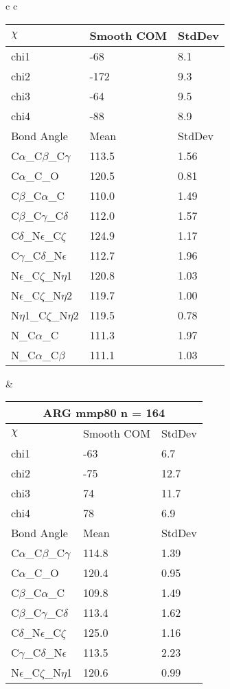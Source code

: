 \begin{longtable}{ c c }
\begin{tabular}{ l l l }
  $\chi$       & Smooth COM & StdDev \\ \midrule
  chi1 & -68 & 8.1 \\ 
  chi2 & -172 & 9.3 \\ 
  chi3 & -64 & 9.5 \\ 
  chi4 & -88 & 8.9 \\ \midrule
  Bond Angle   & Mean     & StdDev \\ \midrule
  C$\alpha$\_C$\beta$\_C$\gamma$ & 113.5 & 1.56\\
  C$\alpha$\_C\_O & 120.5 & 0.81\\
  C$\beta$\_C$\alpha$\_C & 110.0 & 1.49\\
  C$\beta$\_C$\gamma$\_C$\delta$ & 112.0 & 1.57\\
  C$\delta$\_N$\epsilon$\_C$\zeta$ & 124.9 & 1.17\\
  C$\gamma$\_C$\delta$\_N$\epsilon$ & 112.7 & 1.96\\
  N$\epsilon$\_C$\zeta$\_N$\eta$1 & 120.8 & 1.03\\
  N$\epsilon$\_C$\zeta$\_N$\eta$2 & 119.7 & 1.00\\
  N$\eta$1\_C$\zeta$\_N$\eta$2 & 119.5 & 0.78\\
  N\_C$\alpha$\_C & 111.3 & 1.97\\
  N\_C$\alpha$\_C$\beta$ & 111.1 & 1.03\\
  \bottomrule
  \end{tabular}
  &
  \begin{tabular}{ l l l }
  \toprule
  \multicolumn{3}{c}{ARG \textbf{mmp80} n = 164} \\ \toprule
  $\chi$       & Smooth COM & StdDev \\ \midrule
  chi1 & -63 & 6.7 \\ 
  chi2 & -75 & 12.7 \\ 
  chi3 & 74 & 11.7 \\ 
  chi4 & 78 & 6.9 \\ \midrule
  Bond Angle   & Mean     & StdDev \\ \midrule
  C$\alpha$\_C$\beta$\_C$\gamma$ & 114.8 & 1.39\\
  C$\alpha$\_C\_O & 120.4 & 0.95\\
  C$\beta$\_C$\alpha$\_C & 109.8 & 1.49\\
  C$\beta$\_C$\gamma$\_C$\delta$ & 113.4 & 1.62\\
  C$\delta$\_N$\epsilon$\_C$\zeta$ & 125.0 & 1.16\\
  C$\gamma$\_C$\delta$\_N$\epsilon$ & 113.5 & 2.23\\
  N$\epsilon$\_C$\zeta$\_N$\eta$1 & 120.6 & 0.99\\

\end{tabular}
\end{longtable}
